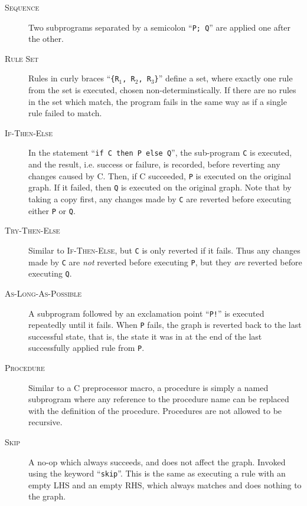 \documentclass[authoryearcitations]{UoYCSproject}
\begin{document}
\begin{description}
    \item[\textsc{Sequence}]
    Two subprograms separated by a semicolon ``\texttt{P; Q}'' are applied
    one after the other.

    \item[\textsc{Rule Set}]
    Rules in curly braces ``\texttt{\{R$_{\text{1}}$, R$_{\text{2}}$, R$_{\text{3}}$\}}''
    define a set, where exactly one rule from the set is executed, chosen
    non-determinstically. If there are no rules in the set which match, the
    program fails in the same way as if a single rule failed to match. 

    \item[\textsc{If-Then-Else}]
    In the statement ``\texttt{if C then P else Q}'', the sub-program \texttt{C}
    is executed, and the result, i.e. success or failure, is recorded, before
    reverting any changes caused by C. Then, if C succeeded, \texttt{P} is
    executed on the original graph. If it failed, then \texttt{Q} is executed on
    the original graph. Note that by taking a copy first, any changes made by
    \texttt{C} are reverted before executing either \texttt{P} or \texttt{Q}.

    \item[\textsc{Try-Then-Else}]
    Similar to \textsc{If-Then-Else}, but \texttt{C} is only reverted if it fails.
    Thus any changes made by \texttt{C} are \emph{not} reverted before executing
    \texttt{P}, but they \emph{are} reverted before executing \texttt{Q}.

    \item[\textsc{As-Long-As-Possible}]
    A subprogram followed by an exclamation point ``\texttt{P!}'' is executed
    repeatedly until it fails. When \texttt{P} fails, the graph is reverted back
    to the last successful state, that is, the state it was in at the end of the
    last successfully applied rule from \texttt{P}.

    \item[\textsc{Procedure}]
    Similar to a C preprocessor macro, a procedure is simply a named subprogram
    where any reference to the procedure name can be replaced with the definition
    of the procedure. Procedures are not allowed to be recursive.

    \item[\textsc{Skip}]
    A no-op which always succeeds, and does not affect the graph. Invoked using the
    keyword ``\texttt{skip}''. This is the same as executing a rule with an empty
    LHS and an empty RHS, which always matches and does nothing to the graph.


\end{description}
\end{document}
